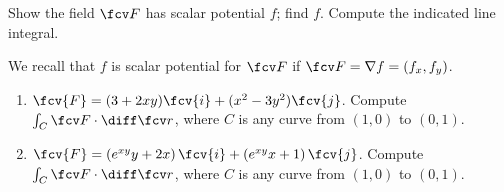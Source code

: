 Show the field $\fcv F$ has scalar potential $f$; find $f$. Compute the indicated line integral.

We recall that $f$ is scalar potential for $\fcv F$ if $\fcv F=\nabla f=\left(f_x,f_y\right)$.
\begin{enumerate}
\item  $\fcv{F} = (3+2xy)\fcv{i} + (x^2-3y^2) \fcv{j}$. Compute $\int_{C} \fcv F\cdot \diff \fcv r$, where $C$ is any curve from $(1,0)$ to $(0,1)$.
\item  $\fcv{F} = \left(e^{x y} y+2 x\right) \fcv{i} + \left( e^{x y} x+1\right) \fcv{j}$. Compute $\int_{C} \fcv F\cdot \diff \fcv r$, where $C$ is any curve from $(1,0)$ to $(0,1)$.

\end{enumerate}